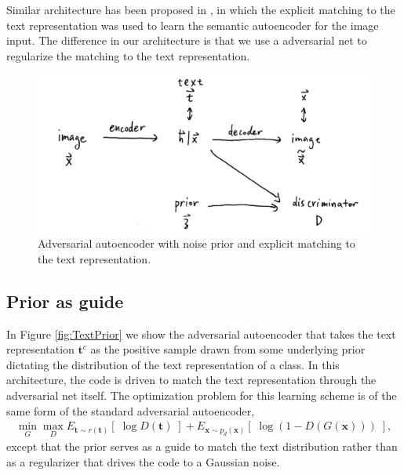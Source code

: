 \documentclass{article}
\newcommand{\bb}[1]{\boldsymbol{#1}}
\begin{document}
	Similar architecture has been proposed in \cite{kodirov2017semantic}, in which the explicit matching to the text representation was used to learn the semantic autoencoder for the image input. The difference in our architecture is that we use a adversarial net to regularize the matching to the text representation.
	


\begin{figure}[h]
\centering
\includegraphics[width = 10 cm]{figNoisePrior}
\caption{Adversarial autoencoder with noise prior and explicit matching to the text representation.}
\label{fig:NoisePrior}
\end{figure}








\subsection{Prior as guide}
	
	In Figure \ref{fig:TextPrior} we show the adversarial autoencoder that takes the text representation $\bb{t}^c$ as the positive sample drawn from some underlying prior dictating the distribution of the text representation of a class. In this architecture, the code is driven to match the text representation through the adversarial net itself. The optimization problem for this learning scheme is of the same form of the standard adversarial autoencoder,
	\begin{align}
		\min_{G} \max_D E_{\bb{t} \sim r(\bb{t})}\left[\; \log D(\bb{t}) \;\right] + E_{\bb{x} \sim p_d(\bb{x})}\left[\; \log( 1 - D(G(\bb{x})) ) \;\right],
	\end{align}
	except that the prior serves as a guide to match the text distribution rather than as a regularizer that drives the code to a Gaussian noise.
\end{document}
